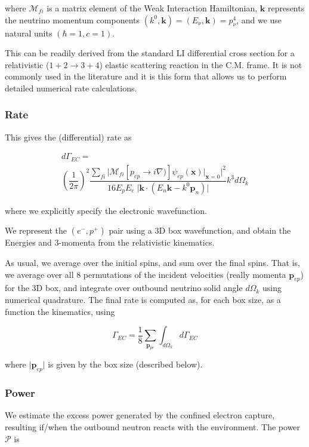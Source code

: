 \documentclass[%
 aip,
 jmp,%
 amsmath,amssymb,
 reprint,%
]{revtex4-1}
\begin{document}
where $\mathcal{M}_{fi}$ is a matrix element of the Weak Interaction Hamiltonian,  $\mathbf{k}$ represents the neutrino momentum components $(k^{0},\mathbf{k})=(E_{\nu},\mathbf{k})=p^{4}_{\nu}$,  and we use natural units $(\hbar=1,c=1)$.

This can be readily derived from the standard LI differential cross section for a relativistic ($1+2\rightarrow 3+4$) elastic scattering reaction in the C.M. frame.  It is not commonly used in the literature and it is this form that  allows us to perform detailed numerical rate calculations.

\subsubsection{Rate}

This gives the (differential) rate as

\begin{multline}
d\Gamma_{EC}=\\
\left(\dfrac{1}{2\pi}\right)^{2}\dfrac{\sum_{fi}\big\vert\mathcal{M}_{fi}\left[p_{ep}\rightarrow i\nabla)\right]\psi_{ep}(\mathbf{x})\big\vert_{\mathbf{x}=0}\big\vert^{2}}{16E_{p}E_{e}\;\big\vert\mathbf{k}\cdot(E{_n}\mathbf{k}-k^{0}\mathbf{p}_{n})\big\vert}k^{3}d\Omega_{k}
\end{multline}

where we explicitly specify the electronic wavefunction.

We represent the $(e^{-},p^{+})$ pair using a 3D box wavefunction, and obtain the Energies and 3-momenta from the relativistic kinematics.  

As usual, we average over the initial spins, and sum over the final spins.  That is, we average over all 8 permutations of the incident velocities (really momenta $\mathbf{p}_{ep}$) for the 3D box, and integrate over outbound neutrino solid angle $d\Omega_{k}$ using numerical quadrature.  The final rate is computed as, for each box size, as a function the kinematics, using

$$\Gamma_{EC}=\frac{1}{8}\sum_{\mathbf{p}_{pe}}\int_{d\Omega_{k}}d\Gamma_{EC}$$

where $\big\vert\mathbf{p}_{ep}\big\vert$ is given by the box size (described below).

\subsubsection{Power}

We  estimate the excess power generated by the confined electron capture, resulting if/when the outbound neutron reacts with the environment. 
The power $\mathcal{P}$ is
\end{document}
